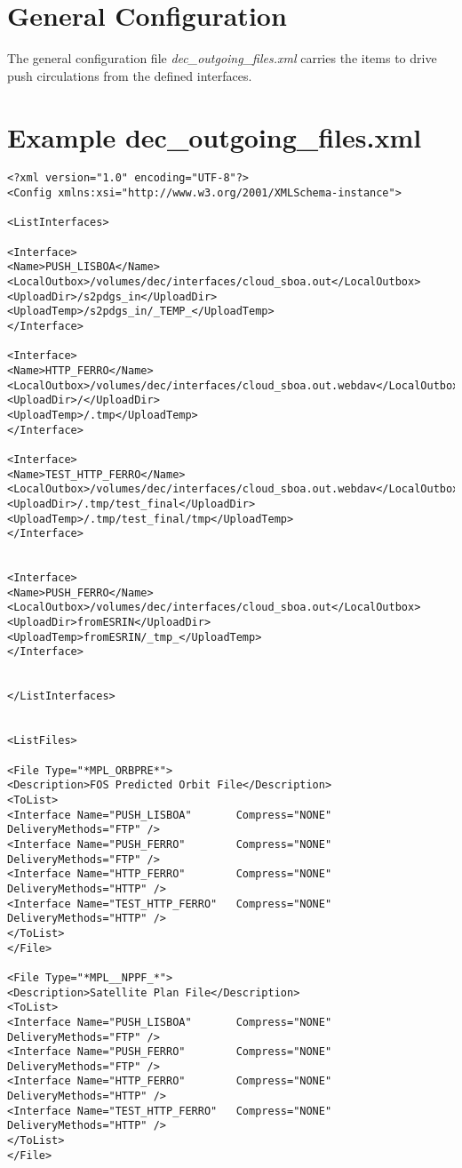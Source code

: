 \documentclass[dec_sum_main.tex]{subfiles}
\begin{document}
\section{General Configuration}
 
\par
\noindent
The general configuration file \textit{dec\_outgoing\_files.xml} carries the items to drive push circulations from the defined interfaces.


\label{decoutgoingfilesxml}
\section{Example dec\_outgoing\_files.xml}

\label{LocalOutbox}

\begin{Verbatim}
<?xml version="1.0" encoding="UTF-8"?>
<Config xmlns:xsi="http://www.w3.org/2001/XMLSchema-instance">

<ListInterfaces>

<Interface>
<Name>PUSH_LISBOA</Name>
<LocalOutbox>/volumes/dec/interfaces/cloud_sboa.out</LocalOutbox>
<UploadDir>/s2pdgs_in</UploadDir>
<UploadTemp>/s2pdgs_in/_TEMP_</UploadTemp>
</Interface>

<Interface>
<Name>HTTP_FERRO</Name>
<LocalOutbox>/volumes/dec/interfaces/cloud_sboa.out.webdav</LocalOutbox>
<UploadDir>/</UploadDir>
<UploadTemp>/.tmp</UploadTemp>
</Interface>

<Interface>
<Name>TEST_HTTP_FERRO</Name>
<LocalOutbox>/volumes/dec/interfaces/cloud_sboa.out.webdav</LocalOutbox>
<UploadDir>/.tmp/test_final</UploadDir>
<UploadTemp>/.tmp/test_final/tmp</UploadTemp>
</Interface>


<Interface>
<Name>PUSH_FERRO</Name>
<LocalOutbox>/volumes/dec/interfaces/cloud_sboa.out</LocalOutbox>
<UploadDir>fromESRIN</UploadDir>
<UploadTemp>fromESRIN/_tmp_</UploadTemp>
</Interface>


</ListInterfaces>


<ListFiles>

<File Type="*MPL_ORBPRE*">
<Description>FOS Predicted Orbit File</Description>
<ToList>
<Interface Name="PUSH_LISBOA"       Compress="NONE"   DeliveryMethods="FTP" />
<Interface Name="PUSH_FERRO"        Compress="NONE"   DeliveryMethods="FTP" />
<Interface Name="HTTP_FERRO"        Compress="NONE"   DeliveryMethods="HTTP" />
<Interface Name="TEST_HTTP_FERRO"   Compress="NONE"   DeliveryMethods="HTTP" />
</ToList>
</File>

<File Type="*MPL__NPPF_*">
<Description>Satellite Plan File</Description>
<ToList>
<Interface Name="PUSH_LISBOA"       Compress="NONE"   DeliveryMethods="FTP" />
<Interface Name="PUSH_FERRO"        Compress="NONE"   DeliveryMethods="FTP" />
<Interface Name="HTTP_FERRO"        Compress="NONE"   DeliveryMethods="HTTP" />
<Interface Name="TEST_HTTP_FERRO"   Compress="NONE"   DeliveryMethods="HTTP" />
</ToList>
</File>


\end{Verbatim}
\end{document}
